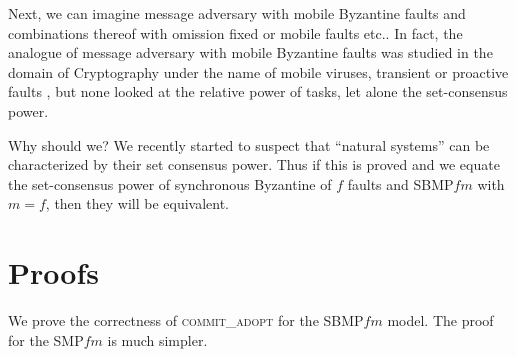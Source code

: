 \documentclass[11pt]{article}
\newcommand{\SMPfm}{\mbox{SMP\!$f\!m$}\xspace}
\newcommand{\SBMPfm}{\mbox{SBMP\!$f\!m$}\xspace}
\newcommand{\ca}{{\small\textsc{commit\!\_adopt}}\xspace}
\begin{document}
Next, we can imagine message adversary with mobile Byzantine faults
and combinations thereof with omission fixed or mobile faults etc..
In fact, the analogue of message adversary with mobile Byzantine faults
was studied in the domain of Cryptography under the name of mobile viruses, transient or proactive faults 
\cite{Ostrovsky:1991,Canetti1994,Rabin1998,Castro:2000},
but none looked at the relative power of tasks, let alone the set-consensus power.


Why should we? We recently \cite{CSC} 
started to suspect that ``natural systems'' can be characterized 
by their set consensus power. Thus if this is proved and we equate the set-consensus power of synchronous Byzantine
of $f$ faults and \SBMPfm with $m=f$, then they will be equivalent.

 
\newpage

\thispagestyle{empty}


\newpage
\appendix


\section{Proofs}\label{sec:Proofs}
We prove the correctness of \ca for the \SBMPfm model. The proof for the \SMPfm is much simpler.
\end{document}
